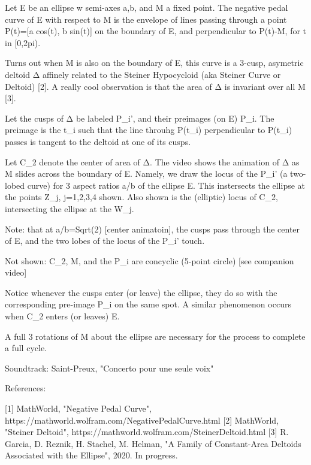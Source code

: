 Let E be an ellipse w semi-axes a,b, and M a fixed point. The negative pedal curve of E with respect to M is the envelope of lines passing through a point P(t)=[a cos(t), b sin(t)] on the boundary of E, and perpendicular to P(t)-M, for t in [0,2pi). 

Turns out when M is also on the boundary of E, this curve is a 3-cusp, asymetric deltoid Δ affinely related to the Steiner Hypocycloid (aka Steiner Curve or Deltoid) [2]. A really cool observation is that the area of Δ is invariant over all M [3].

Let the cusps of Δ be labeled P_i', and their preimages (on E) P_i. The preimage is the t_i such that the line throuhg P(t_i) perpendicular to P(t_i) passes is tangent to the deltoid at one of its cusps.

Let C_2 denote the center of area of Δ. The video shows the animation of Δ as M slides across the boundary of E. Namely, we draw the locus of the P_i' (a two-lobed curve) for 3 aspect ratios a/b of the ellipse E. This instersects the ellipse at the points Z_j, j=1,2,3,4 shown. Also shown is the (elliptic) locus of C_2, intersecting the ellipse at the W_j.

Note: that at a/b=Sqrt(2) [center animatoin], the cusps pass through the center of E, and the two lobes of the locus of the P_i' touch.

Not shown: C_2, M, and the P_i are concyclic (5-point circle) [see companion video]

Notice whenever the cusps enter (or leave) the ellipse, they do so with the corresponding pre-image P_i on the same spot. A similar phenomenon occurs when C_2 enters (or leaves) E.

A full 3 rotations of M about the ellipse are necessary for the process to complete a full cycle.

Soundtrack: Saint-Preux, "Concerto pour une seule voix"

References:

[1] MathWorld, "Negative Pedal Curve", https://mathworld.wolfram.com/NegativePedalCurve.html
[2] MathWorld, "Steiner Deltoid",  https://mathworld.wolfram.com/SteinerDeltoid.html
[3] R. Garcia, D. Reznik, H. Stachel, M. Helman, "A Family of Constant-Area Deltoids Associated with the Ellipse", 2020. In progress.